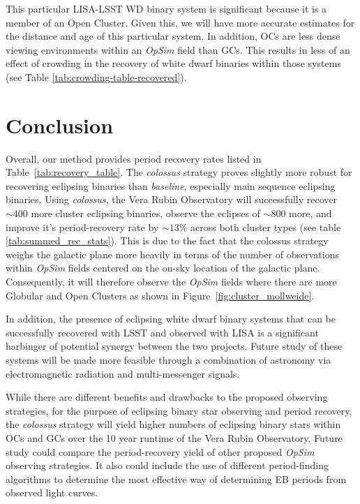 \documentclass[twocolumn]{aastex63}
\begin{document}
This particular LISA-LSST WD binary system is significant because it is a member of an Open Cluster. Given this, we will have more accurate estimates for the distance and age of this particular system.  In addition, OCs are less dense viewing environments within an \textit{OpSim} field than GCs. This results in  less of an effect of crowding in the recovery of white dwarf binaries within those systems (see Table \ref{tab:crowding-table-recovered}). 
\section{Conclusion}
\label{sec:Conclusion}
Overall, our method provides period recovery rates listed in Table~\ref{tab:recovery_table}. The \textit{colossus} strategy proves slightly more robust for recovering eclipsing binaries than \textit{baseline}, especially main sequence eclipsing binaries. Using \textit{colossus}, the Vera Rubin Observatory will successfully recover $\sim400$ more cluster eclipsing binaries, observe the eclipses of $\sim800$ more, and improve it's period-recovery rate by $\sim13\%$ across both cluster types (see table \ref{tab:summed_rec_stats}). This is due to the fact that the colossus strategy weighs the galactic plane more heavily in terms of the number of observations within \textit{OpSim} fields centered on the on-sky location of the galactic plane. Consequently, it will therefore observe the \textit{OpSim} fields where there are more Globular and Open Clusters as shown in Figure~\ref{fig:cluster_mollweide}. 

In addition, the presence of eclipsing white dwarf binary systems that can be successfully recovered with LSST and observed with LISA is a significant harbinger of potential synergy between the two projects. Future study of these systems will be made more feasible through a combination of astronomy via electromagnetic radiation and multi-messenger signals.

While there are different benefits and drawbacks to the proposed observing strategies, for the purpose of eclipsing binary star observing and period recovery, the \textit{colossus} strategy will yield higher numbers of eclipsing binary stars within OCs and GCs over the 10 year runtime of the Vera Rubin Observatory. Future study could compare the period-recovery yield of other proposed \textit{OpSim} observing strategies. It also could include the use of different period-finding algorithms to determine the most effective way of determining EB periods from observed light curves. 
\end{document}
